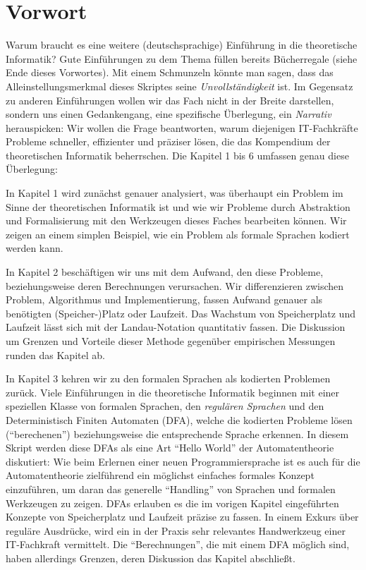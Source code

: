 \chapter{Vorwort}

Warum braucht es eine weitere (deutschsprachige) Einführung
in die theoretische Informatik?
Gute Einführungen zu dem Thema füllen bereits Bücherregale
(siehe Ende dieses Vorwortes).
Mit einem Schmunzeln könnte man sagen,
dass das Alleinstellungsmerkmal dieses Skriptes seine
\emph{Unvollständigkeit} ist.
Im Gegensatz zu anderen Einführungen wollen wir das Fach nicht in der Breite darstellen,
sondern uns einen Gedankengang, eine spezifische Überlegung,
ein \emph{Narrativ} herauspicken:
Wir wollen die Frage beantworten,
warum diejenigen IT-Fachkräfte Probleme
schneller, effizienter und präziser lösen,
die das Kompendium der theoretischen Informatik beherrschen.
Die Kapitel 1 bis 6 umfassen genau diese Überlegung:

In Kapitel 1 wird zunächst genauer analysiert,
was überhaupt ein Problem im Sinne der theoretischen Informatik ist
und wie wir Probleme durch Abstraktion und Formalisierung mit den Werkzeugen
dieses Faches bearbeiten können.
Wir zeigen an einem simplen Beispiel,
wie ein Problem als formale Sprachen kodiert werden kann.

In Kapitel 2 beschäftigen wir uns mit dem Aufwand,
den diese Probleme, beziehungsweise deren Berechnungen verursachen.
Wir differenzieren zwischen Problem, Algorithmus und Implementierung,
fassen Aufwand genauer als benötigten (Speicher-)Platz oder Laufzeit.
Das Wachstum von Speicherplatz und Laufzeit lässt sich
mit der Landau-Notation quantitativ fassen. 
Die Diskussion um Grenzen und Vorteile dieser Methode
gegenüber empirischen Messungen runden das Kapitel ab.

In Kapitel 3 kehren wir zu den formalen Sprachen als kodierten Problemen zurück.
Viele Einführungen in die theoretische Informatik beginnen 
mit einer speziellen Klasse von formalen Sprachen,
den \emph{regulären Sprachen} und
den Deterministisch Finiten Automaten (DFA),
welche die kodierten Probleme lösen (``berechenen'')
beziehungsweise die entsprechende Sprache erkennen.
In diesem Skript werden diese DFAs 
als eine Art ``Hello World'' der Automatentheorie diskutiert:
Wie beim Erlernen einer neuen Programmiersprache
ist es auch für die Automatentheorie zielführend
ein möglichst einfaches formales Konzept einzuführen,
um daran das generelle ``Handling'' von Sprachen und formalen Werkzeugen zu zeigen. 
DFAs erlauben es die im vorigen Kapitel eingeführten
Konzepte von Speicherplatz und Laufzeit präzise zu fassen.
In einem Exkurs über reguläre Ausdrücke,
wird ein in der Praxis sehr relevantes Handwerkzeug einer IT-Fachkraft vermittelt.
Die ``Berechnungen'', die mit einem DFA möglich sind, 
haben allerdings Grenzen, deren Diskussion das Kapitel abschließt.

